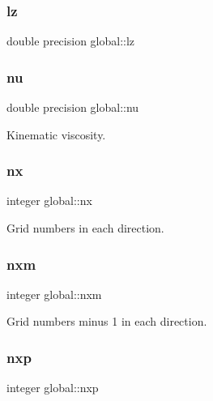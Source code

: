 \mbox{\label{namespaceglobal_a9d90050855b894304d8b4272c6a9ee71}} 
\subsubsection{\texorpdfstring{lz}{lz}}
{\footnotesize\ttfamily double precision global\+::lz}

\mbox{\label{namespaceglobal_a48babc9c7f07053917ca1392e7a7b721}} 
\subsubsection{\texorpdfstring{nu}{nu}}
{\footnotesize\ttfamily double precision global\+::nu}



Kinematic viscosity. 

\mbox{\label{namespaceglobal_a4ba10a6dbbcebb68e0d5e36a6c291898}} 
\subsubsection{\texorpdfstring{nx}{nx}}
{\footnotesize\ttfamily integer global\+::nx}



Grid numbers in each direction. 

\mbox{\label{namespaceglobal_aa37f5fe09139707ac1723302127436b1}} 
\subsubsection{\texorpdfstring{nxm}{nxm}}
{\footnotesize\ttfamily integer global\+::nxm}



Grid numbers minus 1 in each direction. 

\mbox{\label{namespaceglobal_a227001d8177d0295b61a39948436adaa}} 
\subsubsection{\texorpdfstring{nxp}{nxp}}
{\footnotesize\ttfamily integer global\+::nxp}



